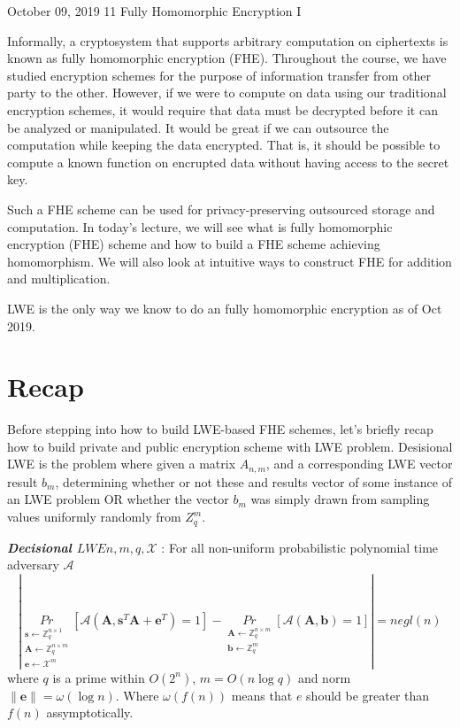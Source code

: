 \documentclass[usletter]{article}
\begin{document}
	
           {October 09, 2019}                          %
           {11}                                       %
           {Fully Homomorphic Encryption I}  %

\newcommand{\floor}[1]{\left\lfloor #1 \right\rfloor}
\newcommand{\ceil}[1]{\left\lceil #1 \right\rceil}

Informally, a cryptosystem that supports arbitrary computation on ciphertexts is known as fully homomorphic encryption (FHE)\cite{wiki}. Throughout the course, we have studied encryption schemes for the purpose of information transfer from other party to the other. However, if we were to compute on data using our traditional encryption schemes, it would require that data must be decrypted before it can be analyzed or manipulated. It would be great if we can outsource the computation while keeping the data encrypted. That is, it should be possible to compute a known function on encrupted data without having access to the secret key. 

Such a FHE scheme can be used for privacy-preserving outsourced storage and computation. In today's lecture, we will see what is fully homomorphic encryption (FHE) scheme and how to build a FHE scheme achieving homomorphism. We will also look at intuitive ways to construct FHE for addition and multiplication.

\begin{fact}
LWE is the only way we know to do an fully homomorphic encryption as of Oct 2019. 
\end{fact}
           
\section{Recap}

Before stepping into how to build LWE-based FHE schemes, let's briefly recap how to build private and public encryption scheme with LWE problem.
Desisional LWE is the problem where given a matrix $A_{n,m}$, and a corresponding LWE vector result $b_m$, determining whether or not these 
and results vector of some instance of an LWE problem OR whether the vector $b_m$ was simply 
drawn from sampling values uniformly randomly from $Z^{m}_{q}$. 
\begin{definition}
\textbf{\textit{Decisional $LWE{n,m,q,\mathcal{X}}$}} : For all non-uniform probabilistic polynomial time adversary $\mathcal{A}$
$$|\underset{\substack{
\pmb{s}\leftarrow \mathbb{Z}_q^{n\times1}\\
\pmb{A}\leftarrow\mathbb{Z}_q^{n\times m}\\
\pmb{e}\leftarrow \mathcal{X}^m}}{Pr}
[\mathcal{A}(\pmb{A},\pmb{s}^T\pmb{A}+\pmb{e}^T)=1]
-\underset{\substack{\pmb{A}\leftarrow\mathbb{Z}_q^{n\times m}\\
\pmb{b}\leftarrow\mathbb{Z}_q^m}}{Pr} 
[\mathcal{A}(\pmb{A},\pmb{b})=1]|=negl(n)$$
where $q$ is a prime within $O(2^n)$, $m=O(n\log q)$ and norm $\parallel \pmb{e}\parallel=\omega(\log n)$. Where $\omega(f(n))$ means that 
$e$ should be greater than $f(n)$ assymptotically.
\end{definition}
\end{document}
